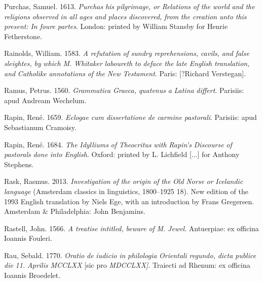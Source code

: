 Purchas, Samuel. 1613. \textit{Purchas} \textit{his} \textit{pilgrimage,} \textit{or} \textit{Relations} \textit{of} \textit{the} \textit{world} \textit{and} \textit{the} \textit{religions} \textit{observed} \textit{in} \textit{all} \textit{ages} \textit{and} \textit{places} \textit{discovered,} \textit{from} \textit{the} \textit{creation} \textit{unto} \textit{this} \textit{present:} \textit{In} \textit{foure} \textit{partes}. London: printed by William Stansby for Henrie Fetherstone.

Rainolds, William. 1583. \textit{A} \textit{refutation} \textit{of} \textit{sundry} \textit{reprehensions,} \textit{cavils,} \textit{and} \textit{false} \textit{sleightes,} \textit{by} \textit{which} \textit{M.} \textit{Whitaker} \textit{laboureth} \textit{to} \textit{deface} \textit{the} \textit{late} \textit{English} \textit{translation,} \textit{and} \textit{Catholike} \textit{annotations} \textit{of} \textit{the} \textit{New} \textit{Testament}. Paris: [?Richard Verstegan].

Ramus, Petrus. 1560. \textit{Grammatica} \textit{Graeca,} \textit{quatenus} \textit{a} \textit{Latina} \textit{differt}. Parisiis: apud Andream Wechelum.

Rapin, René. 1659. \textit{Eclogae} \textit{cum} \textit{dissertatione} \textit{de} \textit{carmine} \textit{pastorali}. Parisiis: apud Sebastianum Cramoisy.

Rapin, René. 1684. \textit{The} \textit{Idylliums} \textit{of} \textit{Theocritus} \textit{with} \textit{Rapin’s} \textit{Discourse} \textit{of} \textit{pastorals} \textit{done} \textit{into} \textit{English}. Oxford: printed by L. Lichfield [...] for Anthony Stephens.

Rask, Rasmus. 2013. \textit{Investigation} \textit{of} \textit{the} \textit{origin} \textit{of} \textit{the} \textit{Old} \textit{Norse} \textit{or} \textit{Icelandic} \textit{language} (Amsterdam classics in linguistics, 1800–1925 18). New edition of the 1993 English translation by Niels Ege, with an introduction by Frans Gregersen. Amsterdam \& Philadelphia: John Benjamins.

Rastell, John. 1566. \textit{A} \textit{treatise} \textit{intitled,} \textit{beware} \textit{of} \textit{M.} \textit{Jewel}. Antuerpiae: ex officina Ioannis Fouleri.

Rau, Sebald. 1770. \textit{Oratio} \textit{de} \textit{iudicio} \textit{in} \textit{philologia} \textit{Orientali} \textit{regundo,} \textit{dicta} \textit{publice} \textit{die} \textit{11.} \textit{Aprilis} \textit{MCCLXX} [sic pro \textit{MDCCLXX]}. Traiecti ad Rhenum: ex officina Ioannis Broedelet.

